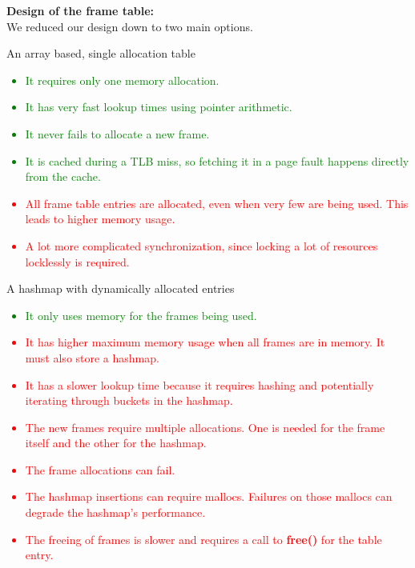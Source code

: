 \documentclass{report}
\newcommand{\fun}[1]{\textcolor{Emerald}{\textbf{#1}}}
\newcommand{\compitem}[1]{\begin{itemize}\setlength\itemsep{-0.1em}#1\end{itemize}}
\begin{document}
				\textbf{Design of the frame table:}
				\\ We reduced our design down to two main options.
				\\ \begin{minipage}[t]{0.45\textwidth}
					\centerline{An array based, single allocation table}
					\textcolor{green}{
						\compitem{
							\item It requires only one memory allocation.
							\item It has very fast lookup times using pointer
							arithmetic.
							\item It never fails to allocate a new frame.
							\item It is cached during a TLB miss, so fetching it
							      in a page fault happens directly from the cache.
						}
					}
					\textcolor{red}{
						\compitem{
							\item All frame table entries are allocated, even 
							when very few are being used. This leads to higher 
							memory usage.
							\item A lot more complicated synchronization,
							      since locking a lot of resources locklessly is
								  required.
						}
					}
				\end{minipage}
				\hfill
				\begin{minipage}[t]{0.45\textwidth}
					\centerline{A hashmap with dynamically allocated entries}
					\textcolor{green}{
						\compitem{
							\item It only uses memory for the frames being used.
						}
					}
					\textcolor{Red}{
						\compitem{
							\item It has higher maximum memory usage when all 
							frames are in memory. It must also store a hashmap.
							\item It has a slower lookup time because it requires 
							hashing and potentially iterating through buckets 
							in the hashmap.
							\item The new frames require multiple allocations.  
							One is needed for the frame itself and the other for
							the hashmap.
							\item The frame allocations can fail.
							\item The hashmap insertions can require mallocs. 
							Failures on those mallocs can degrade the hashmap's
							performance.
							\item The freeing of frames is slower and 
							requires a call to \fun{free()} for the table entry.
						}
					}
				\end{minipage}
\end{document}
